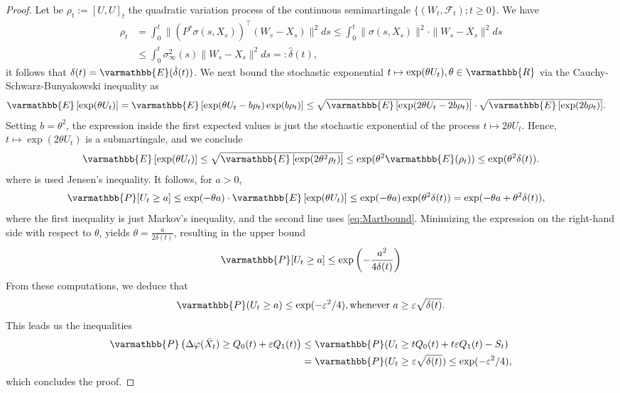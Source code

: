 \documentclass[11pt,reqno]{article}
\let\mathbb=\varmathbb
\renewcommand{\epsilon}{\varepsilon}
\newcommand{\1}{\mathds{1}}
\numberwithin{equation}{section}  %
\theoremstyle{plain}
\theoremstyle{definition}
\theoremstyle{remark}
\numberwithin{theorem}{section}
\numberwithin{remark}{section}
\numberwithin{example}{section}
\begin{document}
\begin{proof}
Let be $\rho_{t}:=[U,U]_{t}$ the quadratic variation process of the continuous semimartingale $\{(W_{t},\mathcal{F}_{t});t\geq 0\}$. We have 
\begin{align*}
\rho_{t}&=\int_{0}^{t}\|(P^\ast\sigma(s,X_s))^{\top}(W_{s}-X_{s})\|^{2}ds \leq \int_{0}^{t}\|\sigma(s,X_s)\|^{2}\cdot\|W_{s}-X_{s}\|^{2}ds \\
&\leq \int_{0}^{t}\sigma^{2}_{\infty}(s)\|W_{s}-X_{s}\|^{2}ds=:\hat{\delta}(t),
\end{align*}
it follows that  $\delta(t) = \mathbb{E}(\hat{\delta}(t))$. We next bound the stochastic exponential $t\mapsto \exp(\theta U_{t}),\theta\in\mathbb{R}$ via the Cauchy-Schwarz-Bunyakowski inequality as 
\begin{align*}
\mathbb{E}\left[\exp(\theta U_{t})\right]&=\mathbb{E}\left[\exp(\theta U_{t}-b\rho_{t})\exp(b\rho_{t})\right]
\leq \sqrt{\mathbb{E}\left[\exp(2\theta U_{t}-2b\rho_{t})\right]}\cdot \sqrt{\mathbb{E}\left[\exp(2b\rho_{t})\right]}. 
\end{align*}
Setting $b=\theta^{2}$, the expression inside the first expected values is just the stochastic exponential of the process $t\mapsto 2\theta U_t$. Hence, $t\mapsto \exp(2\theta U_t)$ is a submartingale, and we conclude 
\begin{equation}\label{eq:Martbound}
\mathbb{E}\left[\exp(\theta U_{t})\right]\leq \sqrt{\mathbb{E}\left[\exp(2\theta^{2}\rho_{t})\right]}\leq {\exp(\theta^2\mathbb{E}(\rho_t))\leq \exp(\theta^{2}\delta(t)).} 
\end{equation}
where is used Jensen's inequality. It follows, for $a>0$,
\begin{align*}
\mathbb{P}[U_{t}\geq a]%
&\leq\exp(-\theta a)\cdot\mathbb{E}\left[\exp(\theta U_t)\right]
\leq \exp(-\theta a)\exp(\theta^{2}\delta(t))=\exp(-\theta a+\theta^{2}\delta(t)),
\end{align*}
where the first inequality is just Markov's inequality, and the second line uses \eqref{eq:Martbound}. Minimizing the expression on the right-hand side with respect to $\theta$, yields $\theta=\frac{a}{2\delta(t)}$, resulting in the upper bound
$$
\mathbb{P}[U_{t}\geq a]\leq \exp\left(-\frac{a^{2}}{4\delta(t)}\right)
$$
From these computations, we deduce that 
\[
\mathbb{P}(U_{t}\geq a)\leq \exp(-\epsilon^{2}/4),  \text{whenever $a\geq \epsilon\sqrt{\delta(t)}$.}
\] 
This leads us the inequalities  
\begin{align*}
\mathbb{P}\left(\Delta\varphi(\bar{X}_t)\geq Q_{0}(t)+\epsilon Q_{1}(t) \right)&\leq \mathbb{P}(U_{t}\geq tQ_{0}(t)+t\epsilon Q_{1}(t)-S_{t})\\
&=\mathbb{P}(U_{t}\geq \epsilon \sqrt{\delta(t)})\leq \exp(-\epsilon^{2}/4),
\end{align*}
which concludes the proof.
\end{proof}
\end{document}
